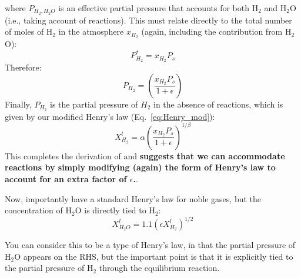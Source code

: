 where $P_{H_2,H_2O}$ is an effective partial pressure that accounts for both H$_2$ and H$_2$O (i.e., taking account of reactions).  This must relate directly to the total number of moles of H$_2$ in the atmosphere $x_{H_2}$ (again, including the contribution from H$_2$O):
\begin{equation}
P_{H_2}^\ast = x_{H_2} P_s
\end{equation}
Therefore:
\begin{equation}
P_{H_2} = \left( \frac{x_{H_2} P_s}{1+\epsilon} \right)
\end{equation}
Finally, $P_{H_2}$ is the partial pressure of $H_2$ in the absence of reactions, which is given by our modified Henry's law (Eq.~\ref{eq:Henry_mod}):
\begin{equation}
X_{H_2}^l = \alpha \left( \frac{x_{H_2} P_s}{1+\epsilon} \right) ^ {1/\beta}
\end{equation}
This completes the derivation of \cite[Eq.~37,][]{OS19} and \textbf{suggests that we can accommodate reactions by simply modifying (again) the form of Henry's law to account for an extra factor of $\epsilon$.}. 

Now, importantly \cite{OS19} have a standard Henry's law for noble gases, but the concentration of H$_2$O is directly tied to H$_2$:
\begin{equation}
X_{H_2O}^l = 1.1 ( \epsilon X_{H_2}^l )^{1/2}
\end{equation}

You can consider this to be a type of Henry's law, in that the partial pressure of H$_2$O appears on the RHS, but the important point is that it is explicitly tied to the partial pressure of H$_2$ through the equilibrium reaction.

